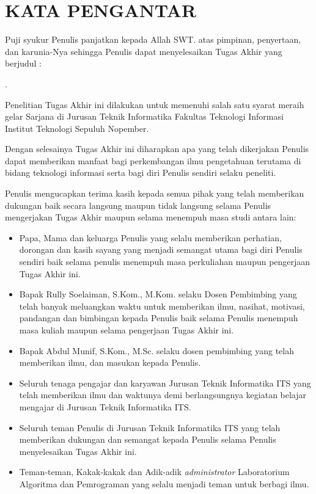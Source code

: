 \chapter{KATA PENGANTAR}

\indent\indent Puji syukur Penulis panjatkan kepada Allah SWT. atas pimpinan, penyertaan, dan karunia-Nya sehingga Penulis dapat menyelesaikan Tugas Akhir yang berjudul :
\begin{center}
	\textbf{\MakeUppercase{\judul}}.
\end{center}

Penelitian Tugas Akhir ini dilakukan untuk memenuhi salah satu syarat meraih gelar Sarjana di Jurusan Teknik Informatika Fakultas Teknologi Informasi Institut Teknologi Sepuluh Nopember.

Dengan selesainya Tugas Akhir ini diharapkan apa yang telah dikerjakan Penulis dapat memberikan manfaat bagi perkembangan ilmu pengetahuan terutama di bidang teknologi informasi serta bagi diri Penulis sendiri selaku peneliti.

Penulis mengucapkan terima kasih kepada semua pihak yang telah memberikan dukungan baik secara langsung maupun tidak langsung selama Penulis mengerjakan Tugas Akhir maupun selama menempuh masa studi antara lain:

\begin{itemize}
	\item Papa, Mama dan keluarga Penulis yang selalu memberikan perhatian, dorongan dan kasih sayang yang menjadi semangat utama bagi diri Penulis sendiri baik selama penulis menempuh masa perkuliahan maupun pengerjaan Tugas Akhir ini.
	\item Bapak Rully Soelaiman, S.Kom., M.Kom. selaku Dosen Pembimbing yang telah banyak meluangkan waktu untuk memberikan ilmu, nasihat, motivasi, pandangan dan bimbingan kepada Penulis baik selama Penulis menempuh masa kuliah maupun selama pengerjaan Tugas Akhir ini.
	\item Bapak Abdul Munif, S.Kom., M.Sc. selaku dosen pembimbing yang telah memberikan ilmu, dan masukan kepada Penulis.
	\item Seluruh tenaga pengajar dan karyawan Jurusan Teknik Informatika ITS yang telah memberikan ilmu dan waktunya demi berlangsungnya kegiatan belajar mengajar di Jurusan Teknik Informatika ITS.
	\item Seluruh teman Penulis di Jurusan Teknik Informatika ITS yang telah memberikan dukungan dan semangat kepada Penulis selama Penulis menyelesaikan Tugas Akhir ini.
	\item Teman-teman, Kakak-kakak dan Adik-adik \textit{administrator} Laboratorium Algoritma dan Pemrograman yang selalu menjadi teman untuk berbagi ilmu.
\end{itemize}

